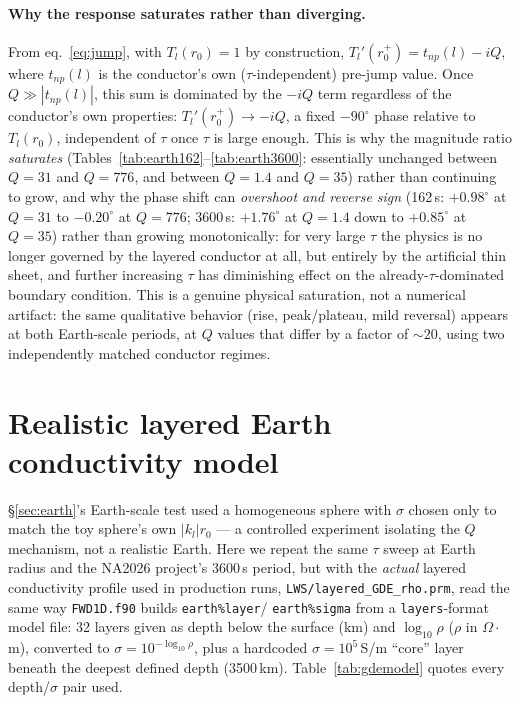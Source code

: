 \documentclass[11pt]{article}
\begin{document}
\paragraph{Why the response saturates rather than diverging.} From eq.~\eqref{eq:jump}, with
$T_l(r_0)=1$ by construction, $T_l'(r_0^+)=t_{np}(l)-iQ$, where $t_{np}(l)$ is the conductor's own
($\tau$-independent) pre-jump value. Once $Q\gg|t_{np}(l)|$, this sum is dominated by the $-iQ$ term
regardless of the conductor's own properties: $T_l'(r_0^+)\to-iQ$, a fixed $-90^\circ$ phase relative
to $T_l(r_0)$, independent of $\tau$ once $\tau$ is large enough. This is why the magnitude ratio
\emph{saturates} (Tables~\ref{tab:earth162}--\ref{tab:earth3600}: essentially unchanged between
$Q=31$ and $Q=776$, and between $Q=1.4$ and $Q=35$) rather than continuing to grow, and why the phase
shift can \emph{overshoot and reverse sign} (162\,s: $+0.98^\circ$ at $Q=31$ to $-0.20^\circ$ at
$Q=776$; 3600\,s: $+1.76^\circ$ at $Q=1.4$ down to $+0.85^\circ$ at $Q=35$) rather than growing
monotonically: for very large $\tau$ the physics is no longer governed by the layered conductor at
all, but entirely by the artificial thin sheet, and further increasing $\tau$ has diminishing effect
on the already-$\tau$-dominated boundary condition. This is a genuine physical saturation, not a
numerical artifact: the same qualitative behavior (rise, peak/plateau, mild reversal) appears at both
Earth-scale periods, at $Q$ values that differ by a factor of ${\sim}20$, using two independently
matched conductor regimes.

\section{Realistic layered Earth conductivity model}
\label{sec:gde}

\S\ref{sec:earth}'s Earth-scale test used a homogeneous sphere with $\sigma$ chosen only to match
the toy sphere's own $|k_l|r_0$ --- a controlled experiment isolating the $Q$ mechanism, not a
realistic Earth. Here we repeat the same $\tau$ sweep at Earth radius and the NA2026 project's
3600\,s period, but with the \emph{actual} layered conductivity profile used in production runs,
\texttt{LWS/layered\_GDE\_rho.prm}, read the same way \texttt{FWD1D.f90} builds \texttt{earth\%layer}/
\texttt{earth\%sigma} from a \texttt{layers}-format model file: 32 layers given as depth below the
surface (km) and $\log_{10}\rho$ ($\rho$ in $\Omega\cdot$m), converted to $\sigma=10^{-\log_{10}\rho}$,
plus a hardcoded $\sigma=10^5$\,S/m ``core'' layer beneath the deepest defined depth (3500\,km).
Table~\ref{tab:gdemodel} quotes every depth/$\sigma$ pair used.
\end{document}
